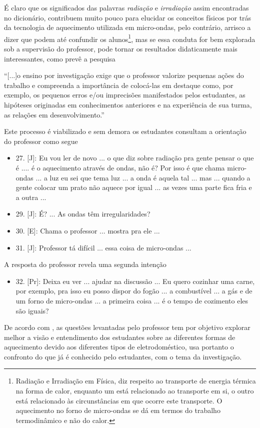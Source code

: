 É claro que os significados das palavras \emph{radiação} e \emph{irradiação} assim encontradas no dicionário, contribuem muito pouco para elucidar os conceitos físicos por trás da tecnologia de aquecimento utilizada em micro-ondas, pelo contrário, arrisco a dizer que podem até confundir os alunos\footnote{Radiação e Irradiação em Física, diz respeito ao transporte de energia térmica na forma de calor, enquanto um está relacionado ao transporte em si, o outro está relacionado às circunstâncias em que ocorre este transporte. O aquecimento no forno de micro-ondas se dá em termos do trabalho termodinâmico e não do calor.}, mas se essa conduta for bem explorada sob a supervisão do professor, pode tornar os resultados didaticamente mais interessantes, como prevê a pesquisa
\begin{citacao}
    ``[...]o ensino por investigação exige que o professor valorize pequenas ações
    do trabalho e compreenda a importância de colocá-las em destaque como, por
    exemplo, os pequenos erros e/ou imprecisões manifestados pelos estudantes, as
    hipóteses originadas em conhecimentos anteriores e na experiência de sua turma,
    as relações em desenvolvimento.'' \cite[p. 58]{SASSERON:2015}
\end{citacao}
Este processo é viabilizado e sem demora os estudantes consultam a orientação do professor como segue
\begin{itemize}
    \item 27. [J]: Eu vou ler de novo ... o que diz sobre radiação pra gente pensar o que é .... é o aquecimento através de ondas, não é? Por isso é que chama micro-ondas ... a luz eu sei que tema luz ... a onda é aquela tal ... mas ... quando a gente colocar um prato não aquece por igual ... as vezes uma parte fica fria e a outra ...
    \item 29. [J]: É? ... As ondas têm irregularidades?
    \item 30. [E]: Chama o professor ... mostra pra ele ...
    \item 31. [J]: Professor tá difícil ... essa coisa de micro-ondas ...
\end{itemize}
A resposta do professor revela uma segunda intenção
\begin{itemize}
    \item 32. [Pr]: Deixa eu ver ... ajudar na discussão ... Eu quero cozinhar uma carne, por exemplo, pra isso eu posso dispor do fogão ... a combustível ... a gás e de um forno de micro-ondas ... a primeira coisa ... é o tempo de cozimento eles são iguais?
\end{itemize}
De acordo com \cite{MORTIMER:2002}, as questões levantadas pelo professor tem por objetivo explorar melhor a visão e entendimento dos estudantes sobre as diferentes formas de aquecimento devido aos diferentes tipos de eletrodoméstico, usa portanto o confronto do que já é conhecido pelo estudantes, com o tema da investigação.

